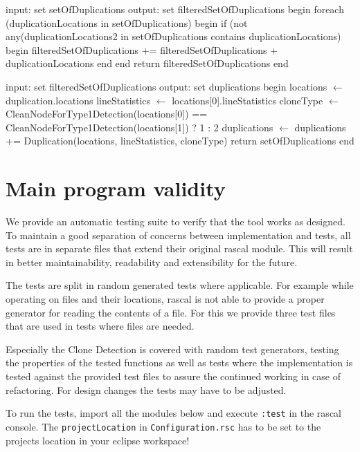 \documentclass{uva-inf-article}
\begin{document}
\begin{pseudocode}[caption={Filtering set of duplications.}, label={alg3}]
input: set setOfDuplications
output: set filteredSetOfDuplications
begin
  foreach (duplicationLocations in setOfDuplications)
    begin
      if (not any(duplicationLocations2 in setOfDuplications contains duplicationLocations)
      begin
        filteredSetOfDuplications += filteredSetOfDuplications + duplicationLocations
      end
    end
  return filteredSetOfDuplications
end
\end{pseudocode}

\begin{pseudocode}[caption={Extracting the final set of duplications.}, label={alg4}]
 input: set filteredSetOfDuplications
 output: set duplications
 begin
  locations $\gets$ duplication.locations
    lineStatistics $\gets$ locations[0].lineStatistics
    cloneType $\gets$ CleanNodeForType1Detection(locations[0]) == CleanNodeForType1Detection(locations[1]) ? 1 : 2
    duplications $\gets$ duplications += Duplication(locations, lineStatistics, cloneType)
  return setOfDuplications
 end       
\end{pseudocode}

\section{Main program validity}

We provide an automatic testing suite to verify that the tool works as designed. To maintain a good separation of concerns between implementation and tests, all tests are in separate files that extend their original rascal module. This will result in better maintainability, readability and extensibility for the future. 

The tests are split in random generated tests where applicable. For example while operating on files and their locations, rascal is not able to provide a proper generator for reading the contents of a file. For this we provide three test files that are used in tests where files are needed. 

Especially the Clone Detection is covered with random test generators, testing the properties of the tested functions as well as tests where the implementation is tested against the provided test files to assure the continued working in case of refactoring. For design changes the tests may have to be adjusted.

To run the tests, import all the modules below and execute \texttt{:test} in the rascal console. The \texttt{projectLocation} in \texttt{Configuration.rsc} has to be set to the projects location in your eclipse workspace!
\end{document}
